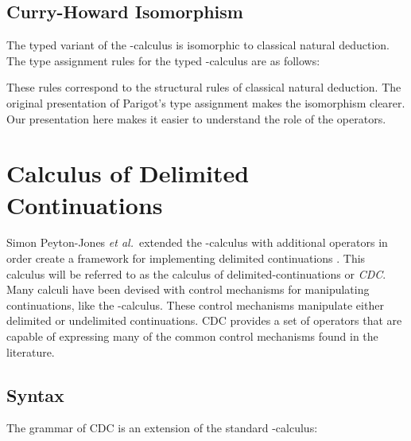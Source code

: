  \subsection{Curry-Howard Isomorphism}
  The typed variant of the \lmu-calculus is isomorphic to classical natural deduction.
  The type assignment rules for the typed \lmu-calculus are as follows:
  
  
  These rules correspond to the structural rules of classical natural deduction.
  The original presentation of Parigot's type assignment makes the isomorphism clearer.
  Our presentation here makes it easier to understand the role of the operators.

\section{Calculus of Delimited Continuations}


  Simon Peyton-Jones \textit{et al.}\ extended the \lam-calculus with additional operators in order create a framework for implementing delimited continuations \cite{JonesDS07}. 
  This calculus will be referred to as the calculus of delimited-continuations or \emph{CDC}. 
  Many calculi have been devised with control mechanisms for manipulating continuations, like the \lmu-calculus.
  These control mechanisms manipulate either delimited or undelimited continuations. 
  CDC provides a set of operators that are capable of expressing many of the common control mechanisms found in the literature.

  \subsection{Syntax}
  The grammar of CDC is an extension of the standard \lam-calculus:

